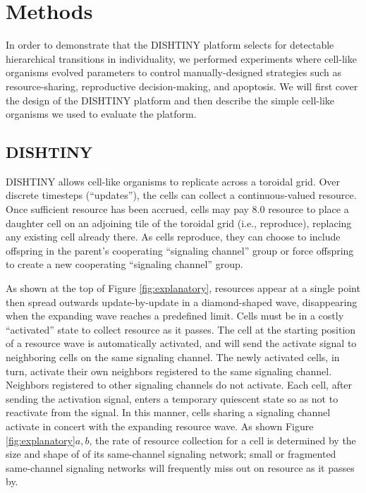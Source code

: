 \section{Methods}

In order to demonstrate that the DISHTINY platform selects for detectable hierarchical transitions in individuality, we performed experiments where cell-like organisms evolved parameters to control manually-designed strategies such as resource-sharing, reproductive decision-making, and apoptosis.
We will first cover the design of the DISHTINY platform and then describe the simple cell-like organisms we used to evaluate the platform.

\subsection{DISHTINY}



DISHTINY allows cell-like organisms to replicate across a toroidal grid.
Over discrete timesteps (``updates''), the cells can collect a continuous-valued resource.
Once sufficient resource has been accrued, cells may pay $8.0$ resource to place a daughter cell on an adjoining tile of the toroidal grid (i.e., reproduce), replacing any existing cell already there.
As cells reproduce, they can choose to include offspring in the parent's cooperating ``signaling channel'' group or force offspring to create a new cooperating ``signaling channel'' group.

As shown at the top of Figure \ref{fig:explanatory}, resources appear at a single point then spread outwards update-by-update in a diamond-shaped wave, disappearing when the expanding wave reaches a predefined limit.
Cells must be in a costly ``activated'' state to collect resource as it passes.
The cell at the starting position of a resource wave is automatically activated, and will send the activate signal to neighboring cells on the same signaling channel.
The newly activated cells, in turn, activate their own neighbors registered to the same signaling channel.
Neighbors registered to other signaling channels do not activate.
Each cell, after sending the activation signal, enters a temporary quiescent state so as not to reactivate from the signal.
In this manner, cells sharing a signaling channel activate in concert with the expanding resource wave.
As shown Figure \ref{fig:explanatory}$a,b$, the rate of resource collection for a cell is determined by the size and shape of of its same-channel signaling network;
small or fragmented same-channel signaling networks will frequently miss out on resource as it passes by.

